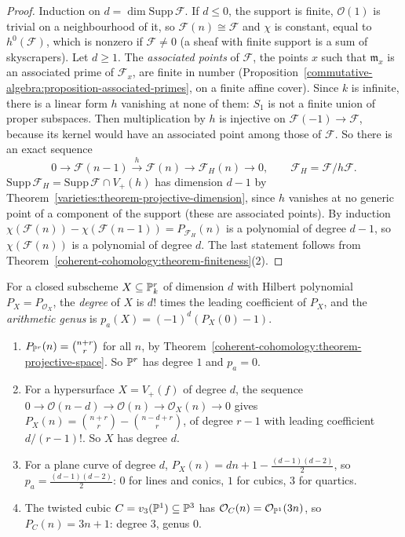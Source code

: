 \begin{proof}
Induction on $d = \dim\mathrm{Supp}\,\mathcal{F}$. If $d \leq 0$, the support is finite, $\mathcal{O}(1)$ is trivial on a neighbourhood of it, so $\mathcal{F}(n) \cong \mathcal{F}$ and
$\chi$ is constant, equal to $h^0(\mathcal{F})$, which is nonzero if $\mathcal{F} \neq 0$ (a sheaf with finite support is a sum of skyscrapers). Let $d \geq 1$. The
\emph{associated points} of $\mathcal{F}$, the points $x$ such that $\mathfrak{m}_x$ is an associated prime of $\mathcal{F}_x$, are finite in number
(Proposition~\ref{commutative-algebra:proposition-associated-primes}, on a finite affine cover). Since $k$ is infinite, there is a linear form $h$ vanishing at none of
them: $S_1$ is not a finite union of proper subspaces. Then multiplication by $h$ is injective on $\mathcal{F}(-1) \to \mathcal{F}$, because its kernel would have
an associated point among those of $\mathcal{F}$. So there is an exact sequence
\[
0 \to \mathcal{F}(n-1) \xrightarrow{h} \mathcal{F}(n) \to \mathcal{F}_H(n) \to 0, \qquad \mathcal{F}_H = \mathcal{F}/h\mathcal{F}.
\]
$\mathrm{Supp}\,\mathcal{F}_H = \mathrm{Supp}\,\mathcal{F} \cap V_+(h)$ has dimension $d - 1$ by Theorem~\ref{varieties:theorem-projective-dimension}, since $h$ vanishes at no generic
point of a component of the support (these are associated points). By induction $\chi(\mathcal{F}(n)) - \chi(\mathcal{F}(n-1)) = P_{\mathcal{F}_H}(n)$ is a polynomial of degree
$d - 1$, so $\chi(\mathcal{F}(n))$ is a polynomial of degree $d$. The last statement follows from Theorem~\ref{coherent-cohomology:theorem-finiteness}(2).
\end{proof}

\begin{definition}\label{coherent-cohomology:definition-degree-genus}
For a closed subscheme $X \subseteq \mathbb{P}^r_k$ of dimension $d$ with Hilbert polynomial $P_X = P_{\mathcal{O}_X}$, the \emph{degree} of $X$ is $d!$ times the leading
coefficient of $P_X$, and the \emph{arithmetic genus} is $p_a(X) = (-1)^d(P_X(0) - 1)$.
\end{definition}

\begin{example}\label{coherent-cohomology:example-hilbert-polynomials}
\begin{enumerate}
\item $P_{\mathbb{P}^r}(n) = \binom{n+r}{r}$ for all $n$, by Theorem~\ref{coherent-cohomology:theorem-projective-space}. So $\mathbb{P}^r$ has degree $1$ and $p_a = 0$.
\item For a hypersurface $X = V_+(f)$ of degree $d$, the sequence $0 \to \mathcal{O}(n-d) \to \mathcal{O}(n) \to \mathcal{O}_X(n) \to 0$ gives
$P_X(n) = \binom{n+r}{r} - \binom{n-d+r}{r}$, of degree $r - 1$ with leading coefficient $d/(r-1)!$. So $X$ has degree $d$.
\item For a plane curve of degree $d$, $P_X(n) = dn + 1 - \frac{(d-1)(d-2)}{2}$, so $p_a = \frac{(d-1)(d-2)}{2}$: $0$ for lines and conics, $1$ for cubics, $3$ for quartics.
\item The twisted cubic $C = v_3(\mathbb{P}^1) \subseteq \mathbb{P}^3$ has $\mathcal{O}_C(n) = \mathcal{O}_{\mathbb{P}^1}(3n)$, so $P_C(n) = 3n + 1$: degree $3$, genus $0$.
\end{enumerate}
\end{example}

